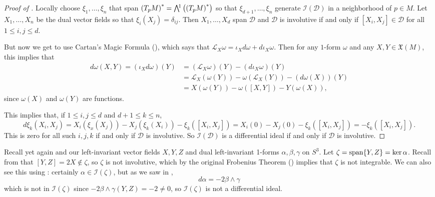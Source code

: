 \begin{proof}[Proof of ]
	Locally choose $\xi_1, \dots , \xi_n$ that span $\left(T_pM\right)^\ast = \ext{1}\left(\left(T_pM\right)^\ast\right)$ so that $\xi_{d+1}, \dots , \xi_n$ generate $\mathcal{I}(\mathcal{D})$ in a neighborhood of $p \in M$. Let $X_1, \dots , X_n$ be the dual vector fields so that $\xi_i(X_j) = \delta_{ij}$. Then $X_1, \dots , X_d$ span $\mathcal{D}$ and $\mathcal{D}$ is involutive if and only if $[X_i, X_j] \in \mathcal{D}$ for all $1 \leq i, j \leq d$.
	
	But now we get to use Cartan's Magic Formula (), which says that $\mathcal{L}_X \omega = \iota_X d\omega + d \iota_X \omega$. Then for any $1$-form $\omega$ and any $X,Y \in \mathfrak{X}(M)$, this implies that
	\begin{align*}
		d \omega(X,Y) = (\iota_X d\omega)(Y) & = (\mathcal{L}_X \omega)(Y)-(d \iota_X \omega)(Y) \\
		& = \mathcal{L}_X(\omega(Y))-\omega(\mathcal{L}_X(Y))-(d\omega(X))(Y) \\
		& = X(\omega(Y))-\omega([X,Y]) - Y(\omega(X)),
	\end{align*}
	since $\omega(X)$ and $\omega(Y)$ are functions.
	
	This implies that, if $1 \leq i, j \leq d$ and $d+1 \leq k \leq n$,
	\[
		d\xi_k(X_i,X_j) = X_i(\xi_x(X_j)) - X_j(\xi_k(X_i)) - \xi_k([X_i,X_j]) = X_i(0) - X_j(0) - \xi_k([X_i,X_j]) = - \xi_k([X_i,X_j]).
	\]
	This is zero for all such $i,j,k$ if and only if $\mathcal{D}$ is involutive. So $\mathcal{I}(\mathcal{D})$ is a differential ideal if and only if $\mathcal{D}$ is involutive.
\end{proof}

\begin{example}
	Recall yet again  and our left-invariant vector fields $X,Y,Z$ and dual left-invariant 1-forms $\alpha, \beta, \gamma$ on $S^3$. Let $\zeta = \operatorname{span}\{Y,Z\} = \ker \alpha$. Recall from  that $[Y,Z] = 2X \notin \zeta$, so $\zeta$ is not involutive, which by the original Frobenius Theorem () implies that $\zeta$ is not integrable. We can also see this using : certainly $\alpha \in \mathcal{I}(\zeta)$, but as we saw in ,
	\[
		d\alpha = -2 \beta \wedge \gamma
	\]
	which is not in $\mathcal{I}(\zeta)$ since $-2\beta \wedge \gamma(Y,Z) = -2 \neq 0$, so $\mathcal{I}(\zeta)$ is not a differential ideal.
\end{example}

